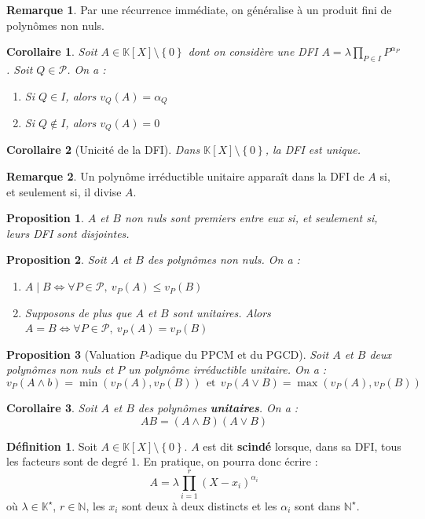 \documentclass[french]{book}
\newcommand{\N}{\mathbb{N}}
\newcommand{\K}{\mathbb{K}}
\newcommand{\st}{^\star}
\theoremstyle{plain}
\newtheorem{prop}{Proposition}[chapter]
\newtheorem{cor}{Corollaire}[chapter]
\theoremstyle{definition}
\newtheorem{dfn}{Définition}[chapter]
\newtheorem{rmq}{Remarque}[chapter]
\theoremstyle{remark}
\begin{document}
\begin{rmq}
	Par une récurrence immédiate, on généralise à un produit fini de polynômes non nuls.
\end{rmq}
\begin{cor}
	Soit $A\in\K[X]\setminus\left\{0\right\}$ dont on considère une DFI $A=\lambda\displaystyle\prod_{P\in I}P^{\alpha_P}$. Soit $Q\in\mathcal{P}$. On a : \begin{enumerate}
		\item Si $Q\in I$, alors $v_Q(A)=\alpha_Q$
		\item Si $Q\notin I$, alors $v_Q(A)=0$
	\end{enumerate}
\end{cor}
\begin{cor}[Unicité de la DFI]
	Dans $\K[X]\setminus\left\{0\right\}$, la DFI est unique.
\end{cor}
\begin{rmq}
	Un polynôme irréductible unitaire apparaît dans la DFI de $A$ si, et seulement si, il divise $A$.
\end{rmq}
\begin{prop}
	$A$ et $B$ non nuls sont premiers entre eux si, et seulement si, leurs DFI sont disjointes.
\end{prop}
\begin{prop}
	Soit $A$ et $B$ des polynômes non nuls. On a : 
	\begin{enumerate}
		\item $A\mid B \Longleftrightarrow \forall P\in\mathcal{P},\ v_P(A)\leqslant v_P(B)$
		\item Supposons de plus que $A$ et $B$ sont unitaires. Alors $A=B \Longleftrightarrow \forall P\in\mathcal{P},\ v_P(A)=v_P(B)$
	\end{enumerate}
\end{prop}
\begin{prop}[Valuation $P$-adique du PPCM et du PGCD]
	Soit $A$ et $B$ deux polynômes non nuls et $P$ un polynôme irréductible unitaire. On a : $$v_P(A\wedge b)=\min(v_P(A),v_P(B)) \ \ \text{et} \ \ v_P(A\vee B)=\max(v_P(A),v_P(B))$$
\end{prop}
\begin{cor}
	Soit $A$ et $B$ des polynômes \textbf{unitaires}. On a : $$AB=(A\wedge B)(A\vee B)$$
\end{cor}
\begin{dfn}
	Soit $A\in\K[X]\setminus\left\{0\right\}$. $A$ est dit \textbf{scindé} lorsque, dans sa DFI, tous les facteurs sont de degré $1$. En pratique, on pourra donc écrire : $$A=\lambda\prod_{i=1}^{r}(X-x_i)^{\alpha_i}$$ où $\lambda\in\K\st$, $r\in\N$, les $x_i$ sont deux à deux distincts et les $\alpha_i$ sont dans $\N\st$.
\end{dfn}
\end{document}
